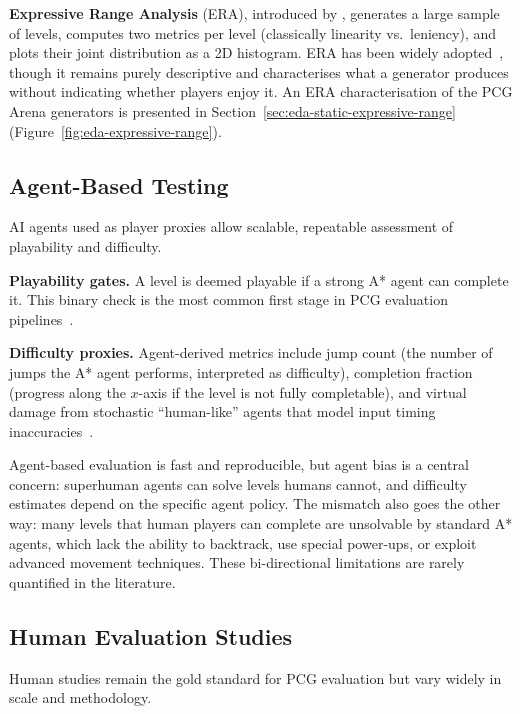 \documentclass[shortabstract, mgr, english]{iithesis}
\begin{document}
\textbf{Expressive Range Analysis} (ERA), introduced by
\citet{smith2010analyzing}, generates a large sample of levels, computes two
metrics per level (classically linearity vs.\ leniency), and plots their joint
distribution as a 2D histogram. ERA has been widely adopted~\citep{horn2014comparative,
shaker2012evolving}, though it remains purely descriptive and characterises what a
generator produces without indicating whether players enjoy it.
An ERA characterisation of the PCG Arena generators is
presented in Section~\ref{sec:eda-static-expressive-range}
(Figure~\ref{fig:eda-expressive-range}).

\subsection{Agent-Based Testing}
\label{subsec:bg-eval-agents}

AI agents used as player proxies allow scalable, repeatable assessment of
playability and difficulty.

\textbf{Playability gates.} A level is deemed playable if a strong A* agent can
complete it. This binary check is the most common first stage in PCG evaluation
pipelines~\citep{volz2018evolving, summerville2016super, khalifa2020pcgrl}.

\textbf{Difficulty proxies.} Agent-derived metrics include jump count (the
number of jumps the A* agent performs, interpreted as difficulty), completion
fraction (progress along the $x$-axis if the level is not fully completable),
and virtual damage from stochastic ``human-like'' agents that model input timing
inaccuracies~\citep{nam2024using}.

Agent-based evaluation is fast and reproducible, but
agent bias is a central concern: superhuman agents can solve levels humans
cannot, and difficulty estimates depend on the specific agent policy. The mismatch also goes the other way:
many levels that human players can complete are unsolvable by standard A* agents,
which lack the ability to backtrack, use special power-ups, or exploit advanced
movement techniques. These bi-directional limitations are rarely quantified in
the literature.

\subsection{Human Evaluation Studies}
\label{subsec:bg-eval-human}

Human studies remain the gold standard for PCG evaluation but vary widely in
scale and methodology.
\end{document}

